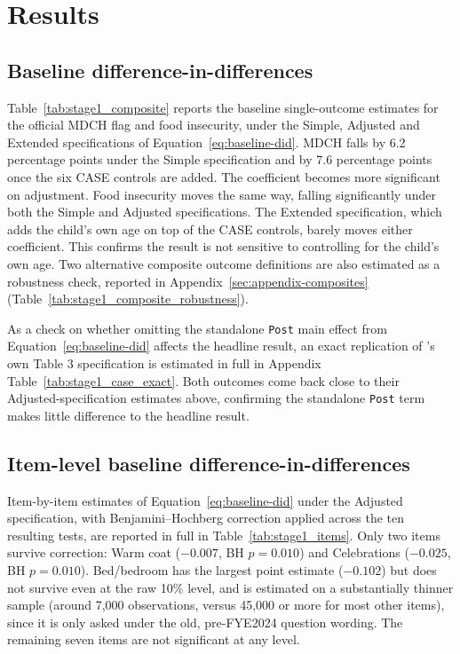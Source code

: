 \section{Results}
\label{sec:results}
 
\subsection{Baseline difference-in-differences}
\label{sec:res-baseline}
 
Table~\ref{tab:stage1_composite} reports the baseline single-outcome estimates for the official MDCH flag and food insecurity, under the Simple, Adjusted and Extended specifications of Equation~\ref{eq:baseline-did}. MDCH falls by 6.2 percentage points under the Simple specification and by 7.6 percentage points once the six CASE controls are added. The coefficient becomes more significant on adjustment. Food insecurity moves the same way, falling significantly under both the Simple and Adjusted specifications. The Extended specification, which adds the child's own age on top of the CASE controls, barely moves either coefficient. This confirms the result is not sensitive to controlling for the child's own age. Two alternative composite outcome definitions are also estimated as a robustness check, reported in Appendix~\ref{sec:appendix-composites} (Table~\ref{tab:stage1_composite_robustness}).
 

 
As a check on whether omitting the standalone \texttt{Post} main effect from Equation~\ref{eq:baseline-did} affects the headline result, an exact replication of \citet{andersen2025}'s own Table 3 specification is estimated in full in Appendix Table~\ref{tab:stage1_case_exact}. Both outcomes come back close to their Adjusted-specification estimates above, confirming the standalone \texttt{Post} term makes little difference to the headline result.
 
\subsection{Item-level baseline difference-in-differences}
\label{sec:res-items}
 
Item-by-item estimates of Equation~\ref{eq:baseline-did} under the Adjusted specification, with Benjamini--Hochberg correction applied across the ten resulting tests, are reported in full in Table~\ref{tab:stage1_items}. Only two items survive correction: Warm coat ($-0.007$, BH $p=0.010$) and Celebrations ($-0.025$, BH $p=0.010$). Bed/bedroom has the largest point estimate ($-0.102$) but does not survive even at the raw 10\% level, and is estimated on a substantially thinner sample (around 7,000 observations, versus 45,000 or more for most other items), since it is only asked under the old, pre-FYE2024 question wording. The remaining seven items are not significant at any level.
 

